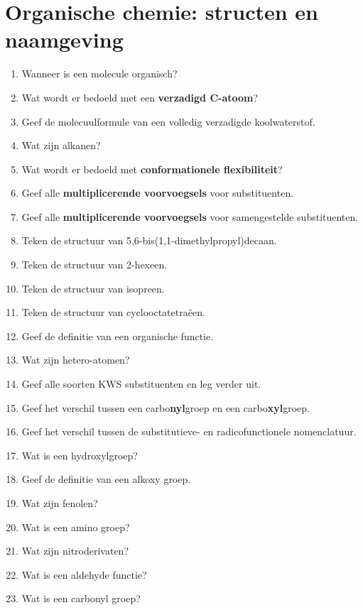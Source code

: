 \documentclass[a4paper,12pt]{article}
\begin{document}
    \maketitle

    \section{Organische chemie: structen en naamgeving}
    \begin{enumerate}
        \item Wanneer is een molecule organisch?
        \item Wat wordt er bedoeld met een \textbf{verzadigd C-atoom}?
        \item Geef de molecuulformule van een volledig verzadigde koolwaterstof.
        \item Wat zijn alkanen?
        \item Wat wordt er bedoeld met \textbf{conformationele flexibiliteit}?
        \item Geef alle \textbf{multiplicerende voorvoegsels} voor substituenten.
        \item Geef alle \textbf{multiplicerende voorvoegsels} voor samengestelde substituenten.
        \item Teken de structuur van 5,6-bis(1,1-dimethylpropyl)decaan.
        \item Teken de structuur van 2-hexeen.
        \item Teken de structuur van isopreen.
        \item Teken de structuur van cyclooctatetra\"een.
        \item Geef de definitie van een organische functie.
        \item Wat zijn hetero-atomen?
        \item Geef alle soorten KWS substituenten en leg verder uit.
        \item Geef het verschil tussen een carbo\textbf{nyl}groep en een carbo\textbf{xyl}groep.
        \item Geef het verschil tussen de substitutieve- en radicofunctionele nomenclatuur.
        \item Wat is een hydroxylgroep?
        \item Geef de definitie van een alkoxy groep.
        \item Wat zijn fenolen?
        \item Wat is een amino groep?
        \item Wat zijn nitroderivaten?
        \item Wat is een aldehyde functie?
        \item Wat is een carbonyl groep?
    \end{enumerate}
\end{document}
